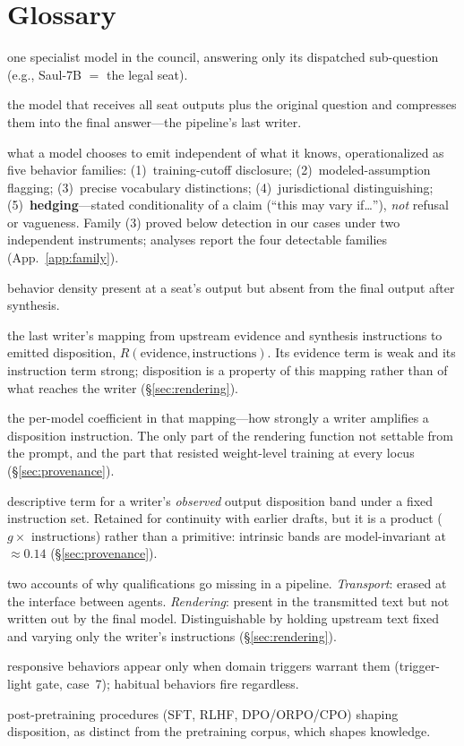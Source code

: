 \documentclass[11pt]{article}
\begin{document}
\section{Glossary}
\begin{description}[leftmargin=1em,style=nextline]
\item[Seat] one specialist model in the council, answering only its dispatched sub-question (e.g., Saul-7B $=$ the legal seat).
\item[Synthesizer / Lead] the model that receives all seat outputs plus the original question and compresses them into the final answer---the pipeline's last writer.
\item[Disposition] what a model chooses to emit independent of what it knows, operationalized as five behavior families: (1)~training-cutoff disclosure; (2)~modeled-assumption flagging; (3)~precise vocabulary distinctions; (4)~jurisdictional distinguishing; (5)~\textbf{hedging}---stated conditionality of a claim (``this may vary if\ldots''), \emph{not} refusal or vagueness. Family (3) proved below detection in our cases under two independent instruments; analyses report the four detectable families (App.~\ref{app:family}).
\item[Synthesis stripping] behavior density present at a seat's output but absent from the final output after synthesis.
\item[Rendering function] the last writer's mapping from upstream evidence and
synthesis instructions to emitted disposition, $R(\text{evidence},
\text{instructions})$. Its evidence term is weak and its instruction term
strong; disposition is a property of this mapping rather than of what reaches
the writer (\S\ref{sec:rendering}).
\item[Instruction gain ($g$)] the per-model coefficient in that mapping---how
strongly a writer amplifies a disposition instruction. The only part of the
rendering function not settable from the prompt, and the part that resisted
weight-level training at every locus (\S\ref{sec:provenance}).
\item[Register] descriptive term for a writer's \emph{observed} output
disposition band under a fixed instruction set. Retained for continuity with
earlier drafts, but it is a product ($g \times$ instructions) rather than a
primitive: intrinsic bands are model-invariant at ${\approx}0.14$
(\S\ref{sec:provenance}).
\item[Transport vs.\ rendering] two accounts of why qualifications go missing
in a pipeline. \emph{Transport}: erased at the interface between agents.
\emph{Rendering}: present in the transmitted text but not written out by the
final model. Distinguishable by holding upstream text fixed and varying only
the writer's instructions (\S\ref{sec:rendering}).
\item[Responsive vs.\ habitual] responsive behaviors appear only when domain triggers warrant them (trigger-light gate, case~7); habitual behaviors fire regardless.
\item[Alignment] post-pretraining procedures (SFT, RLHF, DPO/ORPO/CPO) shaping disposition, as distinct from the pretraining corpus, which shapes knowledge.
\end{description}
\end{document}
